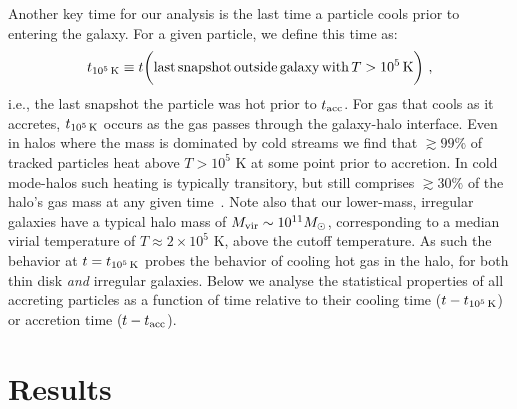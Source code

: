 \documentclass[fleqn,usenatbib]{mnras}
\newcommand{\tcools}{t_{10^5\,{\rm K}}}
\newcommand{\tacc}{t_{\rm acc}}
\begin{document}
Another key time for our analysis is the last time a particle cools prior to entering the galaxy.
For a given particle, we define this time as:
\begin{equation}
    \tcools \equiv t \bigg( {\rm last\,snapshot\,outside\,galaxy\,with\,}T>10^5\,{\rm K} \bigg) ~,
\label{e: tcools}
\end{equation}
i.e., the last snapshot the particle was hot prior to $\tacc$.
For gas that cools as it accretes, $\tcools$ occurs as the gas passes through the galaxy-halo interface.
Even in halos where the mass is dominated by cold streams we find that $\gtrsim99\%$ of tracked particles heat above $T > 10^5$ K at some point prior to accretion.
In cold mode-halos such heating is typically transitory, but still comprises $\gtrsim 30\%$ of the halo's gas mass at any given time~\cite{Hafen2019,Hafen2020}.
Note also that our lower-mass, irregular galaxies have a typical halo mass of $M_{\rm vir} \sim 10^{11} M_\odot$, corresponding to a median virial temperature of $T \approx 2 \times 10^5$ K, above the cutoff temperature.
As such the behavior at $t = \tcools$ probes the behavior of cooling hot gas in the halo, for both thin disk \textit{and} irregular galaxies.
Below we analyse the statistical properties of all accreting particles as a function of time relative to their cooling time ($t-\tcools$) or accretion time ($t-\tacc$).

\section{Results}
\label{s: results}
\end{document}
